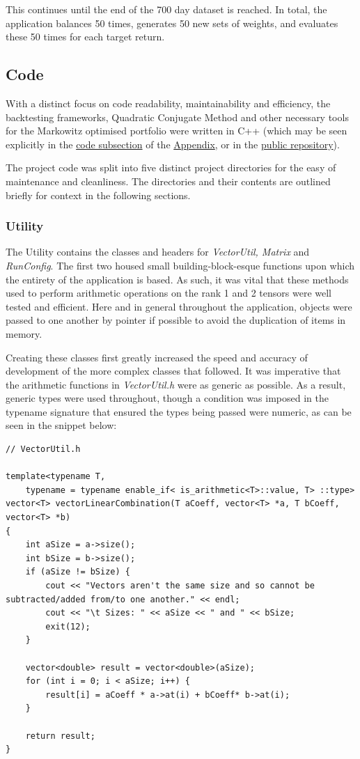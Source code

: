 \documentclass{article}
\begin{document}
This continues until the end of the 700 day dataset is reached. In total, the application balances 50 times, generates 50 new sets of weights, and evaluates these 50 times for each target return.


\subsection{Code}
\label{sec:implementation_code}


With a distinct focus on code readability, maintainability and efficiency, the backtesting frameworks, Quadratic Conjugate Method and other necessary tools for the Markowitz optimised portfolio were written in C++ (which may be seen explicitly in the  \hyperref[sec:code]{code subsection} of the \hyperref[sec:appendix]{Appendix}, or in the \href{https://github.com/indipanesar96/markowitzportfoliooptimiser}{public repository}).


The project code was split into five distinct project directories for the easy of maintenance and cleanliness. The directories and their contents are outlined briefly for context in the following sections.



\subsubsection{Utility}
\label{sec:utility}

The Utility contains the classes and headers for \textit{VectorUtil, Matrix} and \textit{RunConfig}. The first two housed small building-block-esque functions upon which the entirety of the application is based. As such, it was vital that these methods used to perform arithmetic operations on the rank 1 and 2 tensors were well tested and efficient. Here and in general throughout the application, objects were passed to one another by pointer if possible to avoid the duplication of items in memory.

Creating these classes first greatly increased the speed and accuracy of development of the more complex classes that followed.
It was imperative that the arithmetic functions in \textit{VectorUtil.h} were as generic as possible. As a result, generic types were used throughout, though a condition was imposed in the typename signature that ensured the types being passed were numeric, as can be seen in the snippet below:


\begin{lstlisting}
// VectorUtil.h

template<typename T,
	typename = typename enable_if< is_arithmetic<T>::value, T> ::type>
vector<T> vectorLinearCombination(T aCoeff, vector<T> *a, T bCoeff, vector<T> *b) 
{
	int aSize = a->size();
	int bSize = b->size();
	if (aSize != bSize) {
		cout << "Vectors aren't the same size and so cannot be subtracted/added from/to one another." << endl;
		cout << "\t Sizes: " << aSize << " and " << bSize;
		exit(12);
	}
	
	vector<double> result = vector<double>(aSize);
	for (int i = 0; i < aSize; i++) {
		result[i] = aCoeff * a->at(i) + bCoeff* b->at(i);
	}

	return result;
}
\end{lstlisting}
\end{document}
